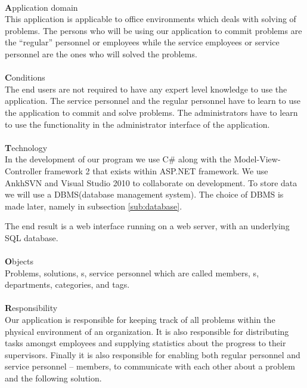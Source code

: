 \ \\
{\Large \textbf{A}}pplication domain \\
This application is applicable to office environments which deals with solving of problems.
The persons who will be using our application to commit problems are the ``regular'' personnel or employees while the service employees or service personnel are the ones who will solved the problems.\\
\ \\
{\Large \textbf{C}}onditions \\ 
The end users are not required to have any expert level knowledge to use the application.
The service personnel and the regular personnel have to learn to use the application to commit and solve problems.
The administrators have to learn to use the functionality in the administrator interface of the application. \\
\ \\
{\Large \textbf{T}}echnology \\
In the development of our program we use C\# along with the Model-View-Controller framework 2 that exists within ASP.NET framework.
We use AnkhSVN and Visual Studio 2010 to collaborate on development.
To store data we will use a DBMS(database management system).
The choice of DBMS is made later, namely in subsection \ref{sub:database}.

The end result is a web interface running on a web server, with an underlying SQL database.\\
\ \\
{\Large \textbf{O}}bjects \\
Problems, solutions, \aclient[]s, service personnel which are called \astaff[] members, \admin{}s, departments, categories, and tags. \\
\ \\
{\Large \textbf{R}}esponsibility \\
Our application is responsible for keeping track of all problems within the physical environment of an organization.
It is also responsible for distributing tasks amongst employees and supplying statistics about the progress to their supervisors.
Finally it is also responsible for enabling both regular personnel and service personnel -- \astaff[] members, to communicate with each other about a problem and the following solution.
\ \\ 

